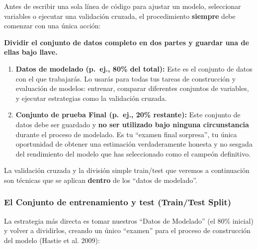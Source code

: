 \documentclass[
  letterpaper,
  DIV=11,
  numbers=noendperiod]{scrreprt}
\providecommand{\tightlist}{%
  \setlength{\itemsep}{0pt}\setlength{\parskip}{0pt}}
\begin{document}
\begin{tcolorbox}[enhanced jigsaw, breakable, toprule=.15mm, bottomtitle=1mm, coltitle=black, colbacktitle=quarto-callout-warning-color!10!white, titlerule=0mm, opacitybacktitle=0.6, bottomrule=.15mm, toptitle=1mm, title=\textcolor{quarto-callout-warning-color}{\faExclamationTriangle}\hspace{0.5em}{El primer paso no negociable: La partición inicial}, arc=.35mm, rightrule=.15mm, opacityback=0, colframe=quarto-callout-warning-color-frame, leftrule=.75mm, left=2mm, colback=white]

Antes de escribir una sola línea de código para ajustar un modelo,
seleccionar variables o ejecutar una validación cruzada, el
procedimiento \textbf{siempre} debe comenzar con una única acción:

\textbf{Dividir el conjunto de datos completo en dos partes y guardar
una de ellas bajo llave.}

\begin{enumerate}
\def\labelenumi{\arabic{enumi}.}
\tightlist
\item
  \textbf{Datos de modelado (p.~ej., 80\% del total):} Este es el
  conjunto de datos con el que trabajarás. Lo usarás para todas tus
  tareas de construcción y evaluación de modelos: entrenar, comparar
  diferentes conjuntos de variables, y ejecutar estrategias como la
  validación cruzada.
\item
  \textbf{Conjunto de prueba Final (p.~ej., 20\% restante):} Este
  conjunto de datos debe ser guardado y \textbf{no ser utilizado bajo
  ninguna circunstancia} durante el proceso de modelado. Es tu ``examen
  final sorpresa'', tu única oportunidad de obtener una estimación
  verdaderamente honesta y no sesgada del rendimiento del modelo que has
  seleccionado como el campeón definitivo.
\end{enumerate}

La validación cruzada y la división simple train/test que veremos a
continuación son técnicas que se aplican \textbf{dentro} de los ``datos
de modelado''.

\end{tcolorbox}

\subsubsection{El Conjunto de entrenamiento y test (Train/Test
Split)}\label{el-conjunto-de-entrenamiento-y-test-traintest-split}

La estrategia más directa es tomar nuestros ``Datos de Modelado'' (el
80\% inicial) y volver a dividirlos, creando un único ``examen'' para el
proceso de construcción del modelo (Hastie et al. 2009):
\end{document}
